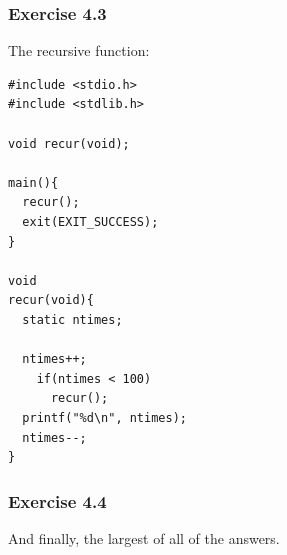   

  \subsubsection*{Exercise 4.3}

   The recursive function:


   \begin{Verbatim}
#include <stdio.h>
#include <stdlib.h>

void recur(void);

main(){
  recur();
  exit(EXIT_SUCCESS);
}

void
recur(void){
  static ntimes;

  ntimes++;
    if(ntimes < 100)
      recur();
  printf("%d\n", ntimes);
  ntimes--;
}
\end{Verbatim}

  

  \subsubsection*{Exercise 4.4}

   And finally, the largest of all of the answers.


